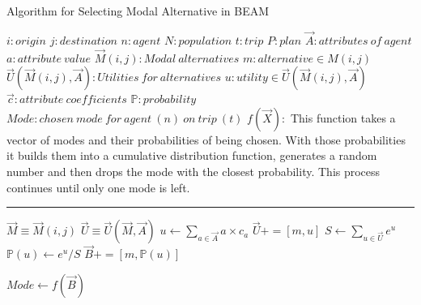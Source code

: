 \documentclass[fancy, masters]{byuthesis}
\begin{document}
\begin{algorithm}
\caption{Algorithm for Selecting Modal Alternative in BEAM}
\begin{algorithmic}[1]
\Require
\State $i : origin$
\State $j : destination$
\State $n: agent$
\State $N: population$
\State $t : trip $
\State $P : plan$
\State $\vec{A}: attributes\:of\:agent$
\State $a: attribute\:value$
\State $\vec{M}(i,j) : Modal\:alternatives$
\State $m : alternative \in M(i,j)$
\State $\vec{U}(\vec{M}(i,j),\vec{A}):Utilities\:for\:alternatives$
\State $u: utility \in \vec{U}(\vec{M}(i,j),\vec{A})$
\State $\vec{c}: attribute\:coefficients$
\State $\mathds{P}: probability$
\State $Mode: chosen\:mode\:for\:agent\:(n)\:on\:trip\:(t)$
\State $f(\vec{X}):$
This function takes a vector of modes and  their probabilities of being chosen. With those probabilities it builds them into a cumulative distribution function, generates a random number and then drops the mode with the closest probability. This process continues until only one mode is left.
\vspace{4pt}\hrule\vspace{5pt}

\State $\vec{M} \equiv \vec{M}(i,j)$
\State $\vec{U} \equiv \vec{U}(\vec{M},\vec{A})$
  \State $u \gets \sum_{a\in \vec{A}} a \times c_a$
  \State $\vec{U} += [m,u]$
\EndFor
\State $S \gets \sum_{u\in \vec{U}}e^u$
    \State $\mathds{P}(u)\gets e^u / S$
    \State $\vec{B} +=[m, \mathds{P}(u)]$
\EndFor 

\State $Mode \gets f(\vec{B})$

\EndProcedure

\EndFor
\EndFor
\Statex
\end{algorithmic}
\end{algorithm}

%
\end{document}
